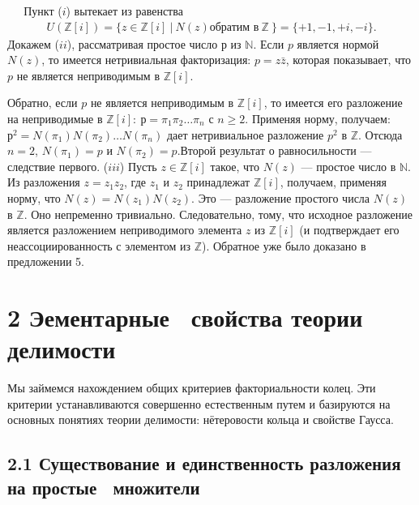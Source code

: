 \documentclass{../../template/mai_book}
\begin{document}
\begin{myproof}
$\;\;\;\;$ Пункт ($i$) вытекает из равенства
\begin{align*}
U(\mathds{Z}[i]) = \{z \in \mathds{Z}[i]\:|\:N(z) \text{обратим в}\:\mathds{Z}\:\} = \{+1,-1,+i,-i\}\text{.}
\end{align*}
\indent Докажем ($ii$), рассматривая простое число $р$ из $\mathds{N}$. Если $p$ является нормой $N(z)$, то имеется нетривиальная факторизация: $p = z\bar{z}$, которая показывает, что $p$ не является неприводимым в $\mathds{Z}[i]$.

\newpage

Обратно, если $p$ не является неприводимым в $\mathds{Z}[i]$, то имеется его разложение на неприводимые в $\mathds{Z}[i]:\:р = \pi_1 \pi_2 \dots \pi_n$ с $n \geqslant 2$. Применяя норму, получаем: $р^2 = N(\pi_1) N(\pi_2) \dots N(\pi_n)$ дает нетривиальное разложение $p^2$ в $\mathds{Z}$. Отсюда $n = 2$, $N(\pi_1) = p$ и $N(\pi_2) = p$.\newline \indent Второй результат о равносильности — следствие первого. \newline \indent ($iii$) Пусть $z \in \mathds{Z}[i]$ такое, что $N(z)$ — простое число в $\mathds{N}$. Из разложения $z = z_1 z_2$, где $z_1$ и $z_2$ принадлежат $\mathds{Z}[i]$, получаем, применяя норму, что $N(z) = N(z_1 ) N(z_2 )$. Это — разложение простого числа $N(z)$ в $\mathds{Z}$. Оно непременно тривиально. Следовательно, тому, что исходное разложение является разложением неприводимого элемента $z$ из $\mathds{Z}[i]$ (и подтверждает его неассоциированность с элементом из $\mathds{Z}$). Обратное уже было доказано в предложении 5.
\end{myproof}

\section{\large{2 Эементарные~ свойства теории~ делимости}}

Мы займемся нахождением общих критериев факториальности колец. Эти критерии устанавливаются совершенно естественным путем и ба­зируются на основных понятиях теории делимости: нётеровости кольца и свойстве Гаусса.

\subsection{2.1 Существование и единственность разложения на \newline простые~ множители}
\end{document}
